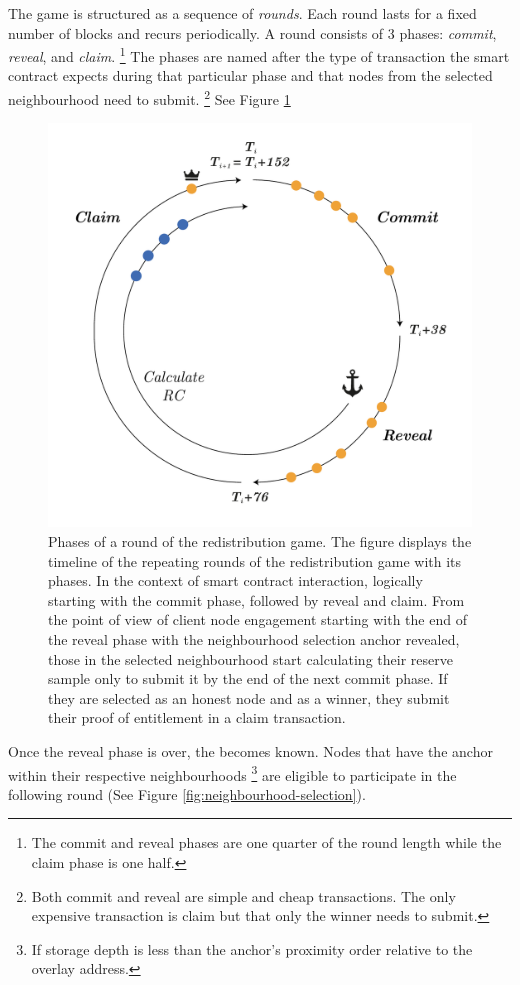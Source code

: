 The game is structured as a sequence of \emph{rounds}. Each round lasts for a fixed number of blocks and recurs periodically. A round consists of 3 phases: \emph{commit}, \emph{reveal}, and \emph{claim}.%
%
\footnote{The commit and reveal phases are one quarter of the round length while the claim phase is one half.
}
%
The phases are named after the type of transaction the smart contract expects during that particular phase and that nodes from the selected neighbourhood need to submit.%
%
\footnote{Both commit and reveal are simple and cheap transactions. The only expensive transaction is claim but that only the winner needs to submit.}
%
See Figure \ref{fig:phases}

\begin{figure}[!ht]
  \centering
    \includegraphics[width=.5\textwidth]{fig/round-lifecycle.pdf}
  \caption[Phases of a round of the redistribution game]{Phases of a round of the redistribution game. The figure displays the timeline of the repeating rounds of the redistribution game with its phases. In the context of smart contract interaction, logically starting with the commit phase, followed by reveal and claim. From the point of view of client node engagement starting with the end of the reveal phase with the neighbourhood selection anchor revealed, those in the selected neighbourhood start calculating their reserve sample only to submit it by the end of the next commit phase. If they are selected as an honest node and as a winner, they submit their proof of entitlement in a claim transaction.}
\label{fig:phases}
\end{figure}    

Once the reveal phase is over, the   becomes known. Nodes that have the anchor within their respective neighbourhoods%
%
\footnote{If storage depth is less than the anchor's proximity order relative to the overlay address.}
%
are  eligible to participate in the following round (See Figure \ref{fig:neighbourhood-selection}).




